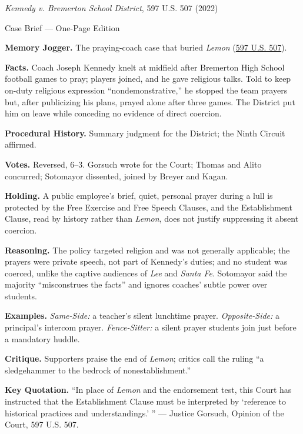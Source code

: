 \documentclass[12pt]{article}
\begin{document}
\begin{center}
{\Large \textit{Kennedy v. Bremerton School District}, 597 U.S. 507 (2022)\par}
\vspace{0.3em}
{\normalsize Case Brief --- One-Page Edition\par}
\end{center}

\textbf{Memory Jogger.} The praying-coach case that buried \textit{Lemon} (\href{https://www.law.cornell.edu/supremecourt/text/21-418}{597 U.S. 507}).

\textbf{Facts.} Coach Joseph Kennedy knelt at midfield after Bremerton High School football games to pray; players joined, and he gave religious talks. Told to keep on-duty religious expression ``nondemonstrative,'' he stopped the team prayers but, after publicizing his plans, prayed alone after three games. The District put him on leave while conceding no evidence of direct coercion.

\textbf{Procedural History.} Summary judgment for the District; the Ninth Circuit affirmed.

\textbf{Votes.} Reversed, 6--3. Gorsuch wrote for the Court; Thomas and Alito concurred; Sotomayor dissented, joined by Breyer and Kagan.

\textbf{Holding.} A public employee's brief, quiet, personal prayer during a lull is protected by the Free Exercise and Free Speech Clauses, and the Establishment Clause, read by history rather than \textit{Lemon}, does not justify suppressing it absent coercion.

\textbf{Reasoning.} The policy targeted religion and was not generally applicable; the prayers were private speech, not part of Kennedy's duties; and no student was coerced, unlike the captive audiences of \textit{Lee} and \textit{Santa Fe}. Sotomayor said the majority ``misconstrues the facts'' and ignores coaches' subtle power over students.

\textbf{Examples.} \emph{Same-Side:} a teacher's silent lunchtime prayer. \emph{Opposite-Side:} a principal's intercom prayer. \emph{Fence-Sitter:} a silent prayer students join just before a mandatory huddle.

\textbf{Critique.} Supporters praise the end of \textit{Lemon}; critics call the ruling ``a sledgehammer to the bedrock of nonestablishment.''

\textbf{Key Quotation.} ``In place of \textit{Lemon} and the endorsement test, this Court has instructed that the Establishment Clause must be interpreted by `reference to historical practices and understandings.' '' --- Justice Gorsuch, Opinion of the Court, 597 U.S. 507.
\end{document}
